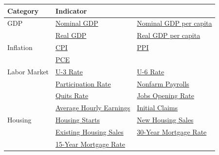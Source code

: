 \documentclass[10pt]{article}
\begin{document}
    \begin{table}[H]
      \centering
      \begin{tabular}{p{2.5cm} p{5cm} p{5cm}}
        \hline
        \hline
        \textbf{Category} & \textbf{Indicator} & \textbf{} \\
        \hline
        GDP & \href{https://fred.stlouisfed.org/series/GDP}{Nominal GDP} & \href{https://fred.stlouisfed.org/series/A939RC0Q052SBEA}{Nominal GDP per capita} \\
            & \href{https://fred.stlouisfed.org/series/GDPC1}{Real GDP} & \href{https://fred.stlouisfed.org/series/A939RX0Q048SBEA}{Real GDP per capita} \\
        \hline
        Inflation & \href{https://www.investing.com/economic-calendar/cpi-733}{CPI} & \href{https://tradingeconomics.com/united-states/producer-prices-change}{PPI} \\
                   & \href{https://tradingeconomics.com/united-states/pce-price-index-annual-change}{PCE} & \\
        \hline
        Labor Market & \href{https://tradingeconomics.com/united-states/unemployment-rate}{U-3 Rate} & \href{https://tradingeconomics.com/united-states/u6-unemployment-rate}{U-6 Rate} \\
                        & \href{https://tradingeconomics.com/united-states/labor-force-participation-rate}{Participation Rate} & \href{https://tradingeconomics.com/united-states/non-farm-payrolls}{Nonfarm Payrolls} \\
                        & \href{https://tradingeconomics.com/united-states/job-quits-rate}{Quits Rate} & \href{https://tradingeconomics.com/united-states/job-offers}{Jobs Opening Rate} \\
                        & \href{https://tradingeconomics.com/united-states/average-hourly-earnings}{Average Hourly Earnings} & \href{https://tradingeconomics.com/united-states/jobless-claims}{Initial Claims} \\
        \hline
        Housing & \href{https://tradingeconomics.com/united-states/housing-starts}{Housing Starts} & \href{https://tradingeconomics.com/united-states/new-home-sales}{New Housing Sales} \\
                  & \href{https://tradingeconomics.com/united-states/existing-home-sales}{Existing Housing Sales} & \href{https://tradingeconomics.com/united-states/30-year-mortgage-rate}{30-Year Mortgage Rate} \\
                  & \href{https://tradingeconomics.com/united-states/15-year-mortgage-rate}{15-Year Mortgage Rate} & \\

\end{tabular}
\end{table}
\end{document}
